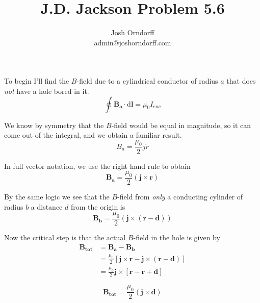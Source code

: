 \documentclass[10pt,a4paper]{article}
\begin{document}
\title{J.D. Jackson Problem 5.6}
\author{Josh Orndorff \\ admin@joshorndorff.com}
\maketitle

To begin I'll find the $B$-field due to a cylindrical conductor of radius $a$ that does \textit{not} have a hole bored in it.
\begin{equation}
\oint \mathbf{B_a} \cdot\mathrm{d}\mathbf{l} = \mu_0I_{enc}
\end{equation}

We know by symmetry that the $B$-field would be equal in magnitude, so it can come out of the integral, and we obtain a familiar result.
\begin{equation}
B_a=\frac{\mu_0}{2}jr
\end{equation}

In full vector notation, we use the right hand rule to obtain
\begin{equation}
\mathbf{B_a}=\frac{\mu_0}{2}(\mathbf{j}\times\mathbf{r})
\end{equation}

By the same logic we see that the $B$-field from \textit{only} a conducting cylinder of radius $b$ a distance $d$ from the origin is
\begin{equation}
\mathbf{B_b}=\frac{\mu_0}{2}(\mathbf{j}\times(\mathbf{r}-\mathbf{d}))
\end{equation}

Now the critical step is that the actual $B$-field in the hole is given by
\begin{align}
\mathbf{B_{tot}}&=\mathbf{B_a}-\mathbf{B_b} \\
&=\frac{\mu_0}{2}[\mathbf{j}\times\mathbf{r}-\mathbf{j}\times(\mathbf{r}-\mathbf{d})] \\
&=\frac{\mu_0}{2}\mathbf{j}\times[\mathbf{r}-\mathbf{r}+\mathbf{d}]
\end{align}

\begin{equation}\boxed{
\mathbf{B_{tot}}=\frac{\mu_0}{2}(\mathbf{j}\times\mathbf{d})
}\end{equation}
\end{document}
